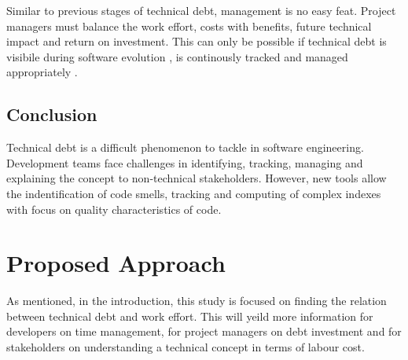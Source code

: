 \documentclass{mprop}
\begin{document}
Similar to previous stages of technical debt, management is no easy feat.
Project managers must balance the work effort, costs with benefits, future
technical impact and return on investment. This can only be possible if
technical debt is visibile during software evolution \cite{Lim2012}
\cite{Morgenthaler2012} \cite{Codabux2013}, is continously tracked and managed
appropriately \cite{Cunningham1993}.

\subsection{Conclusion}

Technical debt is a difficult phenomenon to tackle in software engineering.
Development teams face challenges in identifying, tracking, managing and
explaining the concept to non-technical stakeholders. However, new tools allow
the indentification of code smells, tracking and computing of complex indexes
with focus on quality characteristics of code.

\section{Proposed Approach}
\label{proposed-work}

As mentioned, in the introduction, this study is focused on finding the relation
between technical debt and work effort. This will yeild more information for
developers on time management, for project managers on debt investment and for
stakeholders on understanding a technical concept in terms of labour cost.
\end{document}
